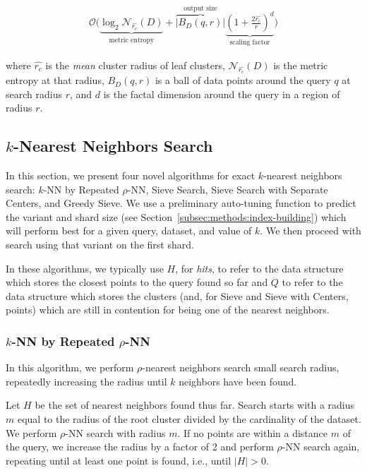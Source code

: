 \begin{gather}
    \mathcal{O}\Bigg(
    \underbrace{\log_2 \mathcal{N}_{\hat{r_c}}(D)}_{\textrm{metric entropy}} +
    \overbrace{\left|B_D(q,r)\right|}^{\textrm{output size}}
    \underbrace{\left(1+\frac{2\hat{r_c}}{r}\right)^d}_{\textrm{scaling factor}}
     \Bigg)
     \label{hierarchical-complexity}
\end{gather}

where $\hat{r_c}$ is the \textit{mean} cluster radius of leaf clusters, $\mathcal{N}_{\hat{r_c}}(D)$ is the metric entropy at that radius, $B_D(q,r)$ is a ball of data points around the query $q$ at search radius $r$, and $d$ is the factal dimension around the query in a region of radius $r$.

\subsection{\texorpdfstring{$k$}{k}-Nearest Neighbors Search}
\label{subsec:methods:knn-search}

In this section, we present four novel algorithms for exact $k$-nearest neighbors search: $k$-NN by Repeated $\rho$-NN, Sieve Search, Sieve Search with Separate Centers, 
and Greedy Sieve. 
We use a preliminary auto-tuning function to predict the variant and shard size (see Section~\ref{subsec:methods:index-building}) which will perform 
best for a given query, dataset, and value of $k$. We then proceed with search using that variant on the first shard. 

In these algorithms, we typically use $H$, for \emph{hits}, to refer to the data structure which stores the closest points to the query found so far and
$Q$ to refer to the data structure which stores the clusters (and, for Sieve and Sieve with Centers, points) which are still in contention for being one of the nearest neighbors.


\subsubsection{$k$-NN by Repeated $\rho$-NN}
\label{subsubsec:methods:knn-search:repeated-rnn}


In this algorithm, we perform $\rho$-nearest neighbors search small search radius, repeatedly increasing the radius until $k$ neighbors
have been found.

Let $H$ be the set of nearest neighbors found thus far.
Search starts with a radius $m$ equal to the radius of the root cluster divided by
the cardinality of the dataset. We perform $\rho$-NN search with radius $m$. 
If no points are within a distance $m$ of the query, we increase the radius by a factor of
2 and perform $\rho$-NN search again, repeating until at least one point is found, i.e., 
until $|H| > 0$.



